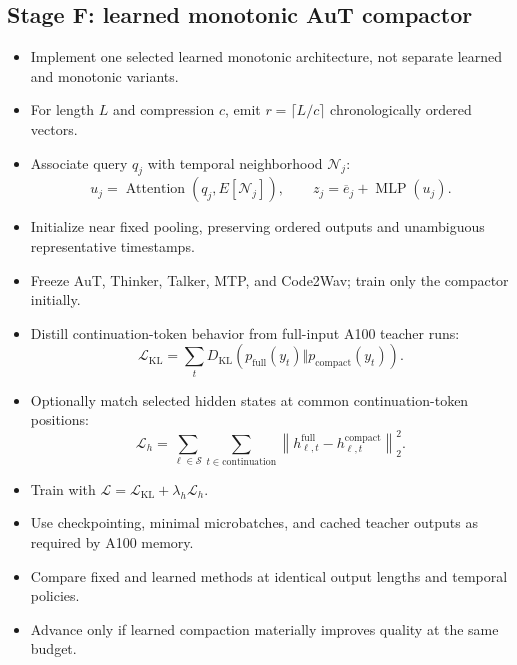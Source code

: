 \documentclass[10pt,letterpaper]{article}
\begin{document}
\subsection{Stage F: learned monotonic AuT compactor}
\begin{itemize}
    \item Implement one selected learned monotonic architecture, not separate learned and monotonic variants.
    \item For length $L$ and compression $c$, emit $r=\lceil L/c\rceil$ chronologically ordered vectors.
    \item Associate query $q_j$ with temporal neighborhood $\mathcal N_j$:
    \[
    u_j=\operatorname{Attention}(q_j,E[\mathcal N_j]),\qquad
    z_j=\overline e_j+\operatorname{MLP}(u_j).
    \]
    \item Initialize near fixed pooling, preserving ordered outputs and unambiguous representative timestamps.
    \item Freeze AuT, Thinker, Talker, MTP, and Code2Wav; train only the compactor initially.
    \item Distill continuation-token behavior from full-input A100 teacher runs:
    \[
    \mathcal L_{\mathrm{KL}}=\sum_t D_{\mathrm{KL}}\left(p_{\mathrm{full}}(y_t)\Vert p_{\mathrm{compact}}(y_t)\right).
    \]
    \item Optionally match selected hidden states at common continuation-token positions:
    \[
    \mathcal L_h=\sum_{\ell\in\mathcal S}\sum_{t\in\mathrm{continuation}}
    \left\|h_{\ell,t}^{\mathrm{full}}-h_{\ell,t}^{\mathrm{compact}}\right\|_2^2.
    \]
    \item Train with $\mathcal L=\mathcal L_{\mathrm{KL}}+\lambda_h\mathcal L_h$.
    \item Use checkpointing, minimal microbatches, and cached teacher outputs as required by A100 memory.
    \item Compare fixed and learned methods at identical output lengths and temporal policies.
    \item Advance only if learned compaction materially improves quality at the same budget.
\end{itemize}
\end{document}
